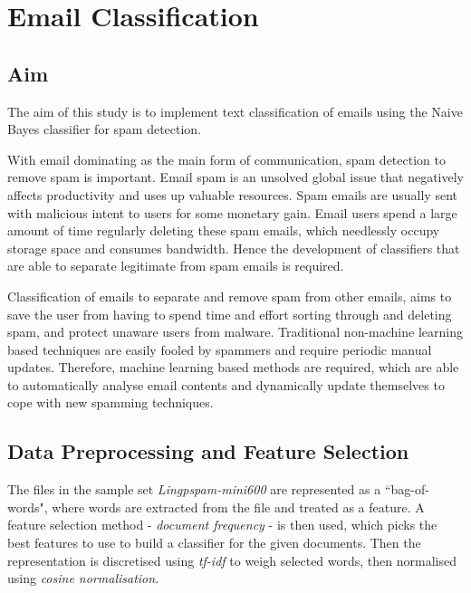\documentclass[10pt, a4paper]{article}
\begin{document}
\section{Email Classification}

\subsection*{Aim}
The aim of this study is to implement text classification of emails using the Naive Bayes classifier for spam detection.

With email dominating as the main form of communication, spam detection to remove spam is important. Email spam is an unsolved global issue that negatively affects productivity and uses up valuable resources. Spam emails are usually sent with malicious intent to users for some monetary gain. Email users spend a large amount of time regularly deleting these spam emails, which needlessly occupy storage space and consumes bandwidth. Hence the development of classifiers that are able to separate legitimate from spam emails is required. 

Classification of emails to separate and remove spam from other emails, aims to save the user from having to spend time and effort sorting through and deleting spam, and protect unaware users from malware. Traditional non-machine learning based techniques are easily fooled by spammers and require periodic manual updates. Therefore, machine learning based methods are required, which are able to automatically analyse email contents and dynamically update themselves to cope with new spamming techniques. 

\subsection*{Data Preprocessing and Feature Selection}
The files in the sample set \emph{Lingpspam-mini600} are represented as a ``bag-of-words", where words are extracted from the file and treated as a feature. A feature selection method - \emph{document frequency} - is then used, which picks the best features to use to build a classifier for the given documents. Then the representation is discretised using \emph{tf-idf} to weigh selected words, then normalised using \emph{cosine normalisation}. 
\end{document}
